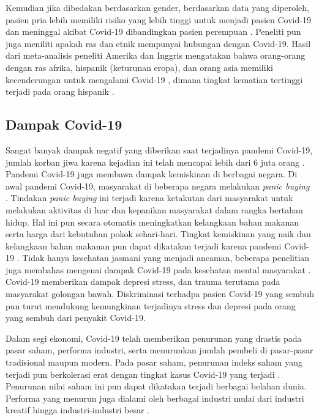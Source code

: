 Kemudian jika dibedakan berdasarkan gender, berdasarkan data yang diperoleh, pasien pria lebih memiliki risiko
yang lebih tinggi untuk menjadi pasien Covid-19 dan meninggal akibat Covid-19 dibandingkan pasien perempuan 
\cite{pmid32450906}. Peneliti pun juga meniliti apakah ras dan etnik mempunyai hubungan dengan Covid-19. Hasil
dari meta-analisis peneliti Amerika dan Inggris mengatakan bahwa orang-orang dengan ras afrika, hispanik (keturunan eropa),
dan orang asia memiliki kecenderungan untuk mengalami Covid-19 \cite{pmid33200120}, dimana tingkat kematian 
tertinggi terjadi pada orang hispanik \cite{pmid33830988}.

\subsection{Dampak Covid-19}
Sangat banyak dampak negatif yang diberikan saat terjadinya pandemi Covid-19, jumlah korban jiwa karena kejadian
ini telah mencapai lebih dari 6 juta orang \cite{WHO}. Pandemi Covid-19 juga membawa dampak kemiskinan di berbagai
negara. Di awal pandemi Covid-19, masyarakat di beberapa negara melakukan \textit{panic buying} \cite{CHEN2022102970}.
Tindakan \textit{panic buying} ini terjadi karena ketakutan dari masyarakat untuk melakukan aktivitas di luar dan
kepanikan masyarakat dalam rangka bertahan hidup. Hal ini pun secara otomatis meningkatkan kelangkaan bahan makanan serta harga dari kebutuhan pokok sehari-hari.
Tingkat kemiskinan yang naik dan kelangkaan bahan makanan pun dapat dikatakan terjadi karena pandemi Covid-19 
\cite{HEADEY2022100626}. Tidak hanya kesehatan jasmani yang menjadi ancaman, beberapa penelitian juga membahas mengenai
dampak Covid-19 pada kesehatan mental masyarakat \cite{CAMPOARIAS2022114337}. Covid-19 memberikan dampak depresi
stress, dan trauma terutama pada masyarakat golongan bawah. Diskriminasi terhadpa pasien Covid-19 yang sembuh pun
turut mendukung kemungkinan terjadinya stress dan depresi pada orang yang sembuh dari penyakit Covid-19.

Dalam segi ekonomi, Covid-19 telah memberikan penurunan yang drastis pada pasar saham, performa industri, serta
menurunkan jumlah pembeli di pasar-pasar tradisional maupun modern. Pada pasar saham, penurunan indeks saham yang
terjadi pun berkolerasi erat dengan tingkat kasus Covid-19 yang terjadi \cite{UDEAJA2022e01076}. Penurunan nilai
saham ini pun dapat dikatakan terjadi berbagai belahan dunia. Performa yang menurun juga dialami oleh berbagai industri
mulai dari industri kreatif \cite{KHLYSTOVA20221192} hingga industri-industri besar \cite{XU202287}.

